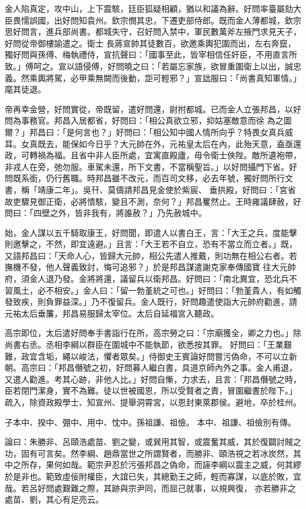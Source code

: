 \begin{pinyinscope}
 金人陷真定，攻中山，上下震駭，廷臣狐疑相顧，猶以和議為辭。好問率臺屬劾大臣畏懦誤國，出好問知袁州。欽宗憫其忠，下遷吏部侍郎。既而金人薄都城，欽宗思好問言，進兵部尚書。都城失守，召好問入禁中，軍民數萬斧左掖門求見天子，好問從帝御樓諭遣之。衛士
 長蔣宣帥其徒數百，欲邀乘輿犯圍而出，左右奔竄，獨好問與孫傅、梅執禮侍，宣抗聲曰：「國事至此，皆宰相信任奸臣，不用直言所致。」傅呵之。宣以語侵傅，好問曉之曰：「若屬忘家族，欲冒重圍衛上以出，誠忠義。然乘輿將駕，必甲乘無闕而後動，詎可輕邪？」宣詘服曰：「尚書真知軍情。」麾其徒退。



 帝再幸金營，好問實從，帝既留，遣好問還，尉拊都城。已而金人立張邦昌，以好問為事務官。邦昌入居都省，好問曰：「相公真欲立邪，抑姑塞敵意而徐
 為之圖爾？」邦昌曰：「是何言也？」好問曰：「相公知中國人情所向乎？特畏女真兵威耳。女真既去，能保如今日乎？大元帥在外，元祐皇太后在內，此殆天意，盍亟還政，可轉禍為福。且省中非人臣所處，宜寓直殿廬，毋令衛士俠陛。敵所遺袍帶，非戎人在旁，弛勿服。車駕未還，所下文書，不當稱聖旨。」以好問攝門下省。好問既系銜，仍行舊職。時邦昌雖不改元，而百司文移，必去年號，獨好問所行文書，稱「靖康二年」。吳幵、莫儔請邦昌見金使於紫宸、
 垂拱殿，好問曰：「宮省故吏驟見御正衛，必將憤駭，變且不測，奈何？」邦昌矍然止。王時雍議肆赦，好問曰：「四壁之外，皆非我有，將誰赦？」乃先赦城中。



 始，金人謀以五千騎取康王，好問聞，即遣人以書白王，言：「大王之兵，度能擊則邀擊之，不然，即宜遠避。」且言：「大王若不自立，恐有不當立而立者。」既，又語邦昌曰：「天命人心，皆歸大元帥，相公先遣人推戴，則功無在相公右者。若撫機不發，他人聲義致討，悔可追邪？」於是邦昌謀遣謝克家奉傳國寶
 往大元帥府，須金人退乃發。金將將還，議留兵以衛邦昌。好問曰：「南北異宜，恐北兵不習風土，必不相安。」金人曰：「留一勃堇統之可也。」好問曰：「勃堇貴人，有如觸發致疾，則負罪益深。」乃不復留兵。金人既行，好問趣遣使詣大元帥府勸進，請元祐太后垂簾，邦昌易服歸太宰位。太后自延福宮入聽政。



 高宗即位，太后遣好問奉手書詣行在所，高宗勞之曰：「宗廟獲全，卿之力也。」除尚書右丞。丞相李綱以群臣在圍城中不能執節，欲悉按其罪。
 好問曰：「王業艱難，政宜含垢，繩以峻法，懼者眾矣。」侍御史王賓論好問嘗污偽命，不可以立新朝。高宗曰：「邦昌僭號之初，好問募人繼白書，具道京師內外之事。金人甫退，又遣人勸進。考其心跡，非他人比。」好問自慚，力求去，且言：「邦昌僭號之時，臣若閉門潔身，實不為難。徒以世被國恩，所以受賢者之責，冒圍繼書於陛下。」疏入，除資政殿學士、知宣州、提舉洞霄宮，以恩封東萊郡侯。避地，卒於桂州。



 子本中、揆中、弸中、用中、忱中。孫祖謙、祖儉。
 本中、祖謙、祖儉別有傳。



 論曰：朱勝非、呂頤浩處苗、劉之變，或巽用其智，或震奮其威，其於復闢討賊之功，固有可言矣。然李綱、趙鼎當世之所謂賢者，而勝非、頤浩視之若冰炭然，其中之所存，果何如哉。範宗尹忍於污張邦昌之偽命，而誣李綱以震主之威，何其繆於是非也。範致虛佞附權臣，大誼已失，其總勤王之師，輕而寡謀，以底於敗，宜哉。若呂好問處艱難之際，其跡與宗尹同，而屈己就事，以規興復，
 亦若勝非之處苗、劉，其心有足亮云。



\end{pinyinscope}